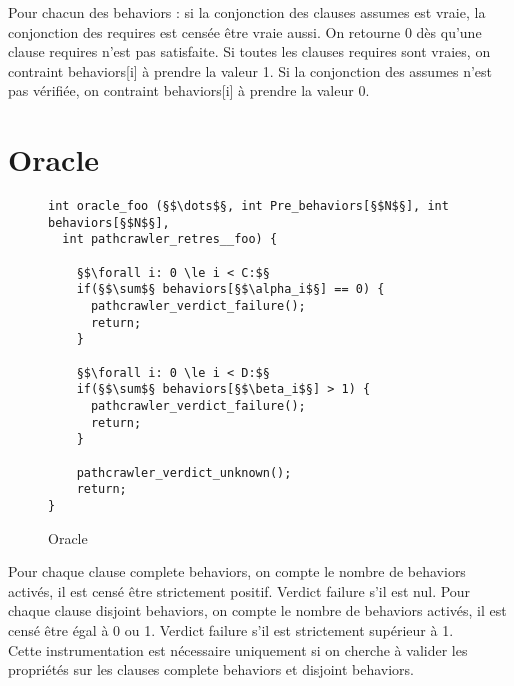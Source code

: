 Pour chacun des behaviors : si la conjonction des clauses assumes est vraie, la
conjonction des requires est censée être vraie aussi. On retourne 0 dès qu'une
clause requires n'est pas satisfaite. Si toutes les clauses requires sont
vraies, on contraint behaviors[i] à prendre la valeur 1.
Si la conjonction des assumes n'est pas vérifiée, on contraint behaviors[i] à
prendre la valeur 0.


\section{Oracle}


\begin{figure}[h]
  \begin{lstlisting}
int oracle_foo (§$\dots$§, int Pre_behaviors[§$N$§], int behaviors[§$N$§],
  int pathcrawler_retres__foo) {
  
    §$\forall i: 0 \le i < C:$§
    if(§$\sum$§ behaviors[§$\alpha_i$§] == 0) {
      pathcrawler_verdict_failure();
      return;
    }

    §$\forall i: 0 \le i < D:$§
    if(§$\sum$§ behaviors[§$\beta_i$§] > 1) {
      pathcrawler_verdict_failure();
      return;
    }

    pathcrawler_verdict_unknown();
    return;
}
  \end{lstlisting}
  \caption{Oracle}
\end{figure}

Pour chaque clause complete behaviors, on compte le nombre de behaviors activés,
il est censé être strictement positif. Verdict failure s'il est nul. Pour chaque
clause disjoint behaviors, on compte le nombre de behaviors activés, il est
censé être égal à 0 ou 1. Verdict failure s'il est strictement supérieur à 1.\\

Cette instrumentation est nécessaire uniquement si on cherche à valider les
propriétés sur les clauses complete behaviors et disjoint behaviors.
